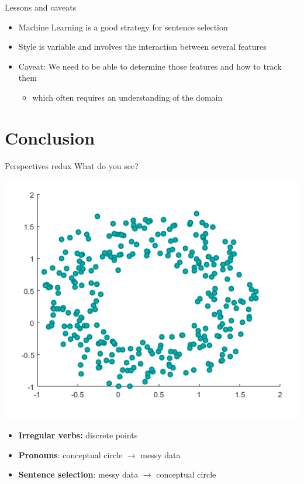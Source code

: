 \documentclass[10pt, compress]{beamer}
\begin{document}
\begin{frame}{Lessons and caveats}
	\begin{itemize}
		\item Machine Learning is a good strategy for sentence selection
		\item Style is variable and involves the interaction between several features \pause
		\item \alert{Caveat:} We need to be able to determine those features and how to track them
		\begin{itemize}
			\item which often requires an understanding of the domain
		\end{itemize}
	\end{itemize}
\end{frame}


\section{Conclusion}
\begin{frame}{Perspectives redux}
	What do you see?
	\begin{center}
		\includegraphics[width=.6\textwidth]{images/circleplot.png}
	\end{center}

	\pause
	\begin{itemize}
		\item \textbf{Irregular verbs:} discrete points	\pause
		\item \textbf{Pronouns}: conceptual circle $\rightarrow$ messy data	\pause
		\item \textbf{Sentence selection}: messy data $\rightarrow$ conceptual circle
	\end{itemize}
\end{frame}
\end{document}
